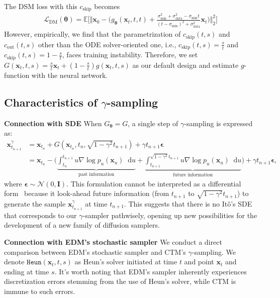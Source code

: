 \documentclass{article} \usepackage{iclr2024_coNFErence,times}
\theoremstyle{definition}
\theoremstyle{remark}
\newcommand*\diff{\mathop{}\!\mathrm{d}}
\begin{document}
The DSM loss with this $c_{\text{skip}}$ becomes
\begin{align*}
    \mathcal{L}_{\text{DM}}(\bm{\theta})=\mathbb{E}\bigg[\bigg\Vert\mathbf{x}_{0}-\bigg(g_{\bm{\theta}}(\mathbf{x}_{t},t,t)+\frac{\sigma_{\text{min}}^{2}+\sigma_{\text{data}}^{2}-\sigma_{\text{min}}t}{(t-\sigma_{\text{min}})^{2}+\sigma_{\text{data}}^{2}}\mathbf{x}_{t}\bigg)\bigg\Vert_{2}^{2}\bigg]
\end{align*}
However, empirically, we find that the parametrization of $c_{\text{skip}}(t,s)$ and $c_{\text{out}}(t,s)$ other than the ODE solver-oriented one, i.e., $c_{\text{skip}}(t,s)=\frac{s}{t}$ and $c_{\text{skip}}(t,s)=1-\frac{s}{t}$, faces training instability. Therefore, we set $G(\mathbf{x}_{t},t,s)=\frac{s}{t}\mathbf{x}_{t}+(1-\frac{s}{t})g(\mathbf{x}_{t},t,s)$ as our default design and estimate $g$-function with the neural network.


\subsection{Characteristics of $\gamma$-sampling}\label{sec:connect_sde}
 
 \textbf{Connection with SDE} When $G_{\bm{\theta}}=G$, a single step of $\gamma$-sampling is expressed as:
\begin{align*}
    \mathbf{x}_{t_{n+1}}^{\gamma}&=\mathbf{x}_{t_{n}} +G(\mathbf{x}_{t_{n}},t_{n},\sqrt{1-\gamma^{2}}t_{n+1})+\gamma t_{n+1}\bm{\epsilon}\\
    &=\mathbf{x}_{t_{n}}- \bigg( \underset{\text{past information}}{\underbrace{\int_{t_{n}}^{t_{n+1}}u\nabla\log{p_{u}(\mathbf{x}_{u})}\diff u}} + \underset{\text{future information}}{\underbrace{\int_{t_{n+1}}^{\sqrt{1-\gamma^{2}}t_{n+1}}u\nabla\log{p_{u}(\mathbf{x}_{u})}\diff u}} \bigg)+\gamma t_{n+1}\bm{\epsilon},
\end{align*}
where $\bm{\epsilon}\sim\mathcal{N}(0,\mathbf{I})$. This formulation cannot be interpreted as a differential form~\citep{oksendal2003stochastic} because it look-ahead future information (from $t_{n+1}$ to $\sqrt{1-\gamma^{2}}t_{n+1}$) to generate the sample $\mathbf{x}_{t_{n+1}}^{\gamma}$ at time $t_{n+1}$. This suggests that there is no It\^o's SDE that corresponds to our $\gamma$-sampler pathwisely, opening up new possibilities for the development of a new family of diffusion samplers.

\textbf{Connection with EDM's stochastic sampler}\label{sec:edm_stochastic}
We conduct a direct comparison between EDM's stochastic sampler and CTM's $\gamma$-sampling. We denote $\texttt{Heun}(\mathbf{x}_t, t, s)$ as Heun's solver initiated at time $t$ and point $\mathbf{x}_t$ and ending at time $s$. It's worth noting that EDM's sampler inherently experiences discretization errors stemming from the use of Heun's solver, while CTM is immune to such errors.
\end{document}

